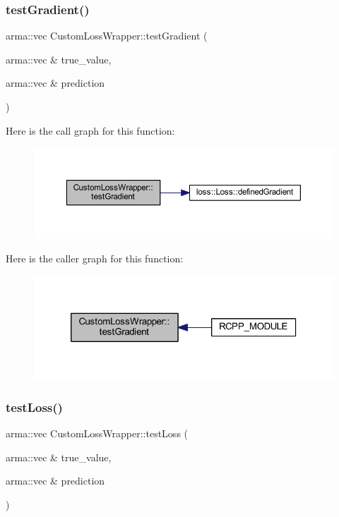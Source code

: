 \subsubsection{\texorpdfstring{test\+Gradient()}{testGradient()}}
{\footnotesize\ttfamily arma\+::vec Custom\+Loss\+Wrapper\+::test\+Gradient (\begin{DoxyParamCaption}\item[{arma\+::vec \&}]{true\+\_\+value,  }\item[{arma\+::vec \&}]{prediction }\end{DoxyParamCaption})\hspace{0.3cm}{\ttfamily [inline]}}

Here is the call graph for this function\+:\nopagebreak
\begin{figure}[H]
\begin{center}
\leavevmode
\includegraphics[width=350pt]{class_custom_loss_wrapper_a177d367857efffc9904b5e38ed4333d1_cgraph}
\end{center}
\end{figure}
Here is the caller graph for this function\+:\nopagebreak
\begin{figure}[H]
\begin{center}
\leavevmode
\includegraphics[width=320pt]{class_custom_loss_wrapper_a177d367857efffc9904b5e38ed4333d1_icgraph}
\end{center}
\end{figure}
\mbox{\label{class_custom_loss_wrapper_a6430fb3e6c2cfaea13e64645ab80d8b7}} 
\subsubsection{\texorpdfstring{test\+Loss()}{testLoss()}}
{\footnotesize\ttfamily arma\+::vec Custom\+Loss\+Wrapper\+::test\+Loss (\begin{DoxyParamCaption}\item[{arma\+::vec \&}]{true\+\_\+value,  }\item[{arma\+::vec \&}]{prediction }\end{DoxyParamCaption})\hspace{0.3cm}{\ttfamily [inline]}}

